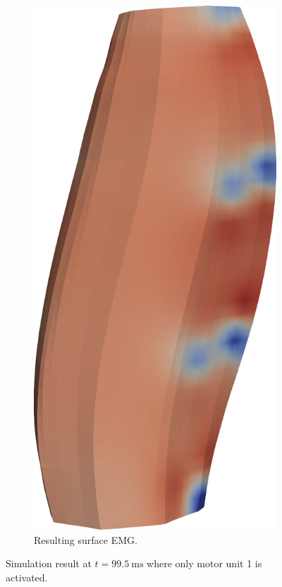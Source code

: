 \begin{figure}[H]
\begin{subfigure}[t]{0.25\textwidth}
    \includegraphics[width=\textwidth]{images/results/application/mu01b.png}%
    \caption{Resulting surface EMG.}%
    \label{fig:mu01b}%
  \end{subfigure}   
  \caption{Simulation result at $t=\SI{99.5}{\milli\second}$ where only motor unit 1 is activated.}%
  \label{fig:result_mu1}%
\end{figure}%

